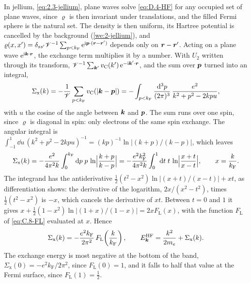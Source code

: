 In jellium, \cref{eq:2.3-jellium}, plane waves solve \cref{eq:D.4-HF} for any occupied set of plane waves, since $\varrho$ is then invariant under translations, and the filled Fermi sphere is the natural set. The density is then uniform, its Hartree potential is cancelled by the background (\cref{we:2-jellium}), and $\varrho(x, x') = \delta_{ss'}\mathscr{V}^{-1}\sum_{p < k_{\mathrm{F}}}\mathrm{e}^{\mathrm{i}\bm{p}\cdot(\bm{r} - \bm{r}')}$ depends only on $\bm{r} - \bm{r}'$. Acting on a plane wave $\mathrm{e}^{\mathrm{i}\bm{k}\cdot\bm{r}}$, the exchange term multiplies it by a number. With $U_2$ written through its transform, $\mathscr{V}^{-1}\sum_{\bm{k}'}v_{\mathrm{C}}(k')\,\mathrm{e}^{-\mathrm{i}\bm{k}'\cdot\bm{r}}$, and the sum over $\bm{p}$ turned into an integral,
\begin{equation*}
  \Sigma_{\mathrm{x}}(k) = -\frac{1}{\mathscr{V}}\sum_{p < k_{\mathrm{F}}}v_{\mathrm{C}}(|\bm{k} - \bm{p}|)
  = -\int_{p < k_{\mathrm{F}}}\frac{\mathrm{d}^3p}{(2\pi)^3}\,\frac{e^2}{k^2 + p^2 - 2kpu} ,
\end{equation*}
with $u$ the cosine of the angle between $\bm{k}$ and $\bm{p}$. The sum runs over one spin, since $\varrho$ is diagonal in spin: only electrons of the same spin exchange. The angular integral is $\int_{-1}^1\dd u\,(k^2 + p^2 - 2kpu)^{-1} = (kp)^{-1}\ln|(k + p)/(k - p)|$, which leaves
\begin{equation*}
  \Sigma_{\mathrm{x}}(k) = -\frac{e^2}{4\pi^2k}\int_0^{k_{\mathrm{F}}}\mathrm{d} p\;p\,\ln\Bigl|\frac{k + p}{k - p}\Bigr|
  = -\frac{e^2k_{\mathrm{F}}^2}{4\pi^2k}\int_0^1\mathrm{d} t\;t\,\ln\Bigl|\frac{x + t}{x - t}\Bigr| , \qquad x = \frac{k}{k_{\mathrm{F}}} .
\end{equation*}
The integrand has the antiderivative $\tfrac12(t^2 - x^2)\ln|(x + t)/(x - t)| + xt$, as differentiation shows: the derivative of the logarithm, $2x/(x^2 - t^2)$, times $\tfrac12(t^2 - x^2)$ is $-x$, which cancels the derivative of $xt$. Between $t = 0$ and $1$ it gives $x + \tfrac12(1 - x^2)\ln|(1 + x)/(1 - x)| = 2xF_{\mathrm{L}}(x)$, with the function $F_{\mathrm{L}}$ of \cref{eq:C.8-FL} evaluated at $x$. Hence
\begin{equation}
  \Sigma_{\mathrm{x}}(k) = -\frac{e^2k_{\mathrm{F}}}{2\pi^2}\,F_{\mathrm{L}}\!\left(\frac{k}{k_{\mathrm{F}}}\right), \qquad
  E^{\mathrm{HF}}_{\bm{k}} = \frac{k^2}{2m_e} + \Sigma_{\mathrm{x}}(k) .
  \label{eq:D.4-gas}
\end{equation}
The exchange energy is most negative at the bottom of the band, $\Sigma_{\mathrm{x}}(0) = -e^2k_{\mathrm{F}}/2\pi^2$, since $F_{\mathrm{L}}(0) = 1$, and it falls to half that value at the Fermi surface, since $F_{\mathrm{L}}(1) = \tfrac12$.

